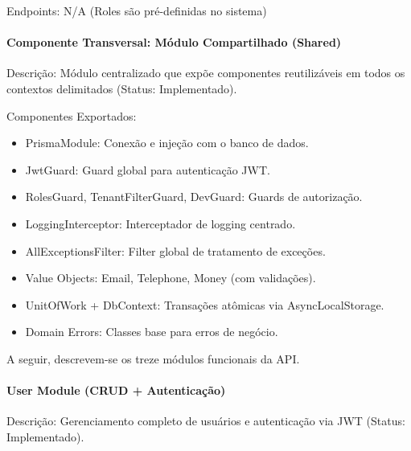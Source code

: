 Endpoints: N/A (Roles são pré-definidas no sistema)

\paragraph{Componente Transversal: Módulo Compartilhado (Shared)}

Descrição: Módulo centralizado que expõe componentes reutilizáveis em todos os contextos delimitados (Status: Implementado).

Componentes Exportados:
\begin{itemize}
\item PrismaModule: Conexão e injeção com o banco de dados.
\item JwtGuard: Guard global para autenticação JWT.
\item RolesGuard, TenantFilterGuard, DevGuard: Guards de autorização.
\item LoggingInterceptor: Interceptador de logging centrado.
\item AllExceptionsFilter: Filter global de tratamento de exceções.
\item Value Objects: Email, Telephone, Money (com validações).
\item UnitOfWork + DbContext: Transações atômicas via AsyncLocalStorage.
\item Domain Errors: Classes base para erros de negócio.
\end{itemize}

A seguir, descrevem-se os treze módulos funcionais da API.

\paragraph{User Module (CRUD + Autenticação)}

Descrição: Gerenciamento completo de usuários e autenticação via JWT (Status: Implementado).

